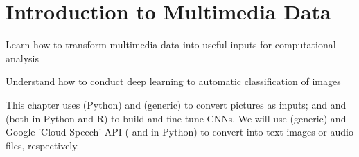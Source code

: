 \chapter{Introduction to Multimedia Data}
\label{chap:image}

\begin{abstract}{Abstract}
 
Digitally collected data often does not only contain texts, but also audio, images and videos. Instead of using only textual features as we did in previous chapters, we could as well use, for instance, pixel values
to analyse images. Without going into detail, in this chapter we will show how to store, represent and convert multimedia data in order to use it as an input in our computational analysis. We will then focus on image analysis using machine learning classification techniques based on deep learning, and will explain how to build (or fine-tune) a Convolutional Neural Network (CNN) by ourselves. We will discuss how to obtain text from images (OCR) and audio (speech-to-text), which allows to apply text analytics to  multimedia data. Finally we will see how to use a commercial service (Amazon Rekognition) to conduct this image classification. 
\end{abstract}


\begin{objectives}
\item Learn how to transform multimedia data into useful inputs for computational analysis
\item Understand how to conduct deep learning to automatic classification of images
\end{objectives}

\begin{feature}
This chapter uses  (Python) and  (generic) to convert pictures as inputs; and  and  (both in Python and R) to build and fine-tune CNNs. We will use  (generic) and  Google 'Cloud Speech' API ( and  in Python) to convert into text images or audio files, respectively.
\end{feature}



